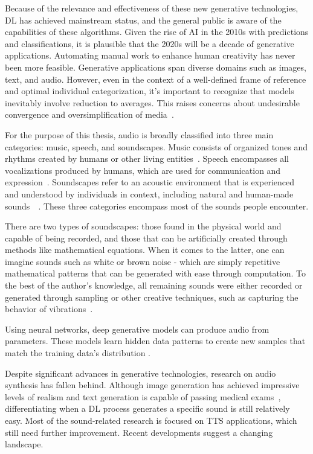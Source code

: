 Because of the relevance and effectiveness of these new generative technologies, \ac{DL} has achieved mainstream status, and the general public is aware of the capabilities of these algorithms. Given the rise of \ac{AI} in the 2010s with predictions and classifications, it is plausible that the 2020s will be a decade of generative applications. Automating manual work to enhance human creativity has never been more feasible. Generative applications span diverse domains such as images, text, and audio. However, even in the context of a well-defined frame of reference and optimal individual categorization, it's important to recognize that models inevitably involve reduction to averages. This raises concerns about undesirable convergence and oversimplification of media~\cite{forero_j_are_2023}.

For the purpose of this thesis, audio is broadly classified into three main categories: music, speech, and soundscapes. Music consists of organized tones and rhythms created by humans or other living entities~\cite{oxford_english_dictionary_music_2023}. Speech encompasses all vocalizations produced by humans, which are used for communication and expression~\cite{holden_origin_2004}. Soundscapes refer to an acoustic environment that is experienced and understood by individuals in context, including natural and human-made sounds~~\cite{international_organization_for_standardization_iso_2014, schafer_tuning_1977}. These three categories encompass most of the sounds people encounter.

There are two types of soundscapes: those found in the physical world and capable of being recorded, and those that can be artificially created through methods like mathematical equations. When it comes to the latter, one can imagine sounds such as white or brown noise - which are simply repetitive mathematical patterns that can be generated with ease through computation. To the best of the author's knowledge, all remaining sounds were either recorded or generated through sampling or other creative techniques, such as capturing the behavior of vibrations~\cite{trautmann_classical_2003}.

Using neural networks, deep generative models can produce audio from parameters. These models learn hidden data patterns to create new samples that match the training data's distribution \cite{huzaifah_deep_2021}.

Despite significant advances in generative technologies, research on audio synthesis has fallen behind. Although image generation has achieved impressive levels of realism and text generation is capable of passing medical exams~\cite{strong_chatbot_2023}, differentiating when a \ac{DL} process generates a specific sound is still relatively easy. Most of the sound-related research is focused on \ac{TTS} applications, which still need further improvement. Recent developments suggest a changing landscape.

